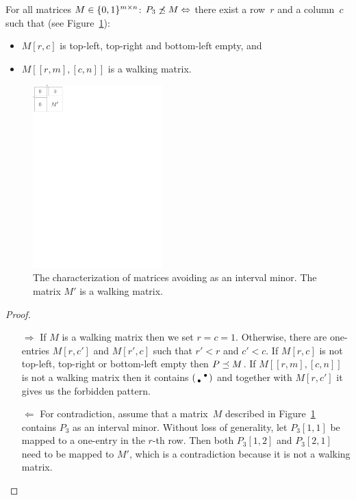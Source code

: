 \begin{prop}
\label{prop:p31}
For all matrices $M\in\{0,1\}^{m\times n}$: $P_3\not\preceq M\Leftrightarrow$ there exist a row~$r$ and a column~$c$ such that (see Figure~\ref{fig:p12}):
\begin{itemize}
\item $M[r,c]$ is top-left, top-right and bottom-left empty, and
\item $M[[r,m],[c,n]]$ is a walking matrix.
\end{itemize}
\end{prop}
\begin{figure}[!ht]
\centering
\includegraphics[width=50mm]{img/p12.pdf}
\caption{The characterization of matrices avoiding \usebox{\smlmat} as an interval minor. The matrix $M'$ is a walking matrix.}
\label{fig:p12}
\end{figure}
\begin{proof}
\begin{itemize}
	\item[$\Rightarrow$] If $M$ is a walking matrix then we set $r=c=1$. Otherwise, there are one-entries $M[r,c']$ and $M[r',c]$ such that $r'<r$ and $c'<c$. If $M[r,c]$ is not top-left, top-right or bottom-left empty then $P\preceq M$. If $M[[r,m],[c,n]]$ is not a walking matrix then it contains $\left(\begin{smallmatrix} &\bullet\\\bullet& \end{smallmatrix}\right)$ and together with $M[r,c']$ it gives us the forbidden pattern.
	\item[$\Leftarrow$] For contradiction, assume that a matrix~$M$ described in Figure~\ref{fig:p12} contains $P_3$ as an interval minor. Without loss of generality, let $P_3[1,1]$ be mapped to a one-entry in the $r$-th row. Then both $P_3[1,2]$ and $P_3[2,1]$ need to be mapped to $M'$, which is a contradiction because it is not a walking matrix.
\end{itemize}
\end{proof}

